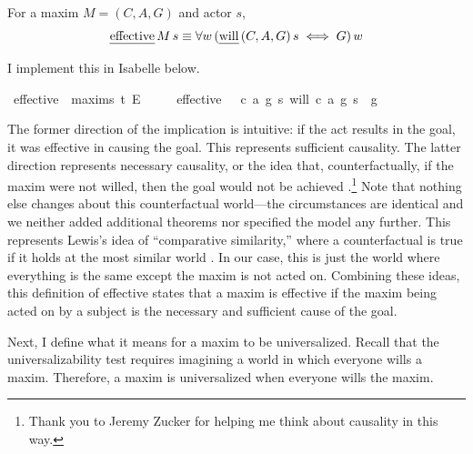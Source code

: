 \begin{isabellebody}
\begin{isamarkuptext}
\begin{definition}
For a maxim $M = (C, A, G)$ and actor $s$,
$$\text{\emph{effective}} \, M \, s \equiv \forall w \, (\text{\emph{will}} \, (C, A, G) \, s \iff G) \, w$$
\end{definition}
\noindent I implement this in Isabelle below.%
\end{isamarkuptext}\isamarkuptrue%
\isamarkupfalse%
\ effective\ {\isacharcolon}{\isacharcolon}\ {\isachardoublequoteopen}maxim{\isasymRightarrow}s{\isasymRightarrow}\ t{\isachardoublequoteclose}\ {\isacharparenleft}{\isachardoublequoteopen}E\ {\isacharunderscore}\ {\isacharunderscore}{\isachardoublequoteclose}{\isacharparenright}\isanewline
\ \ \ {\isachardoublequoteopen}effective\ \ {\isasymequiv}\ {\isasymlambda}{\isacharparenleft}c{\isacharcomma}\ a{\isacharcomma}\ g{\isacharparenright}\ s{\isachardot}\ {\isacharparenleft}{\isacharparenleft}will\ {\isacharparenleft}c{\isacharcomma}\ a{\isacharcomma}\ g{\isacharparenright}\ s{\isacharparenright}\ \isactrlbold {\isasymequiv}\ g{\isacharparenright}{\isachardoublequoteclose}\isanewline
%
%
\begin{isamarkuptext}%
The former direction of the implication is intuitive: if the act results in the goal, it was 
effective in causing the goal. This represents sufficient causality. The latter direction represents 
necessary causality, or the idea that, counterfactually, if the maxim were not willed, then the goal 
would not be achieved \citep{lewiscausality}.\footnote{Thank you to Jeremy Zucker for helping me 
think about causality in this way.}  Note that nothing else changes about this
counterfactual world—the circumstances are identical and we neither added additional theorems nor 
specified the model any further. This represents Lewis's idea of ``comparative similarity,''  where 
a counterfactual is true if it holds at the most similar world \citep{lewiscounterfactuals}. 
In our case, this is just the world where everything is the same except the maxim is not acted on.
Combining these ideas, this definition of effective states that a maxim is effective if the 
maxim being acted on by a subject is the necessary and sufficient cause of the goal.

Next, I define what it means for a maxim to be universalized. Recall that the universalizability 
test requires imagining a world in which everyone wills a maxim. Therefore, a maxim is universalized
when everyone wills the maxim. 


\end{isamarkuptext}
\end{isabellebody}

